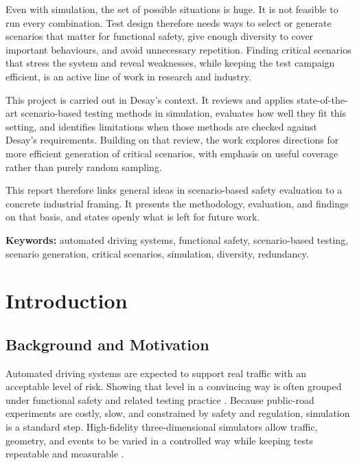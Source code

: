 \documentclass[12pt,a4paper]{report}
\begin{document}
Even with simulation, the set of possible situations is huge. It is not feasible to run every combination. Test design therefore needs ways to select or generate scenarios that matter for functional safety, give enough diversity to cover important behaviours, and avoid unnecessary repetition. Finding critical scenarios that stress the system and reveal weaknesses, while keeping the test campaign efficient, is an active line of work in research and industry.

This project is carried out in Desay's context. It reviews and applies state-of-the-art scenario-based testing methods in simulation, evaluates how well they fit this setting, and identifies limitations when those methods are checked against Desay's requirements. Building on that review, the work explores directions for more efficient generation of critical scenarios, with emphasis on useful coverage rather than purely random sampling.

This report therefore links general ideas in scenario-based safety evaluation to a concrete industrial framing. It presents the methodology, evaluation, and findings on that basis, and states openly what is left for future work.

\vspace{0.5em}
\noindent\textbf{Keywords:} automated driving systems, functional safety, scenario-based testing, scenario generation, critical scenarios, simulation, diversity, redundancy.

\tableofcontents
\listoffigures
\listoftables

\clearpage
{}

\chapter{Introduction}

\section{Background and Motivation}
Automated driving systems are expected to support real traffic with an acceptable level of risk. Showing that level in a convincing way is often grouped under functional safety and related testing practice \cite{iso26262,iso21448,sae3016}. Because public-road experiments are costly, slow, and constrained by safety and regulation, simulation is a standard step. High-fidelity three-dimensional simulators allow traffic, geometry, and events to be varied in a controlled way while keeping tests repeatable and measurable \cite{pegasus_method,carla_official,metadrive_docs}.
\end{document}
